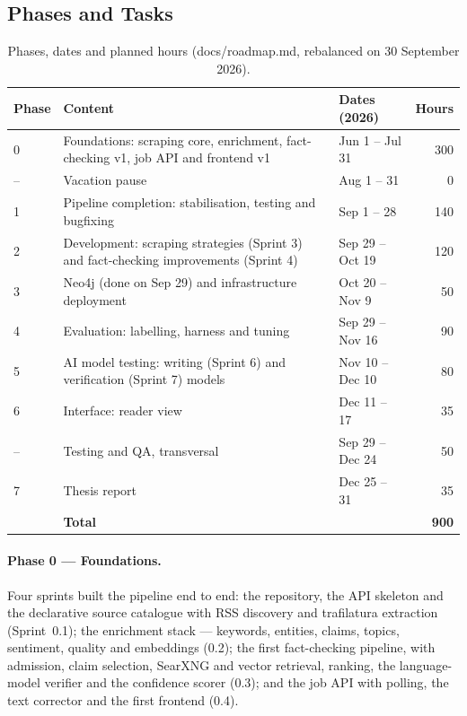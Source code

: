 
\subsection{Phases and Tasks}
\label{subsec:phases}

\begin{table}[H]
\centering
\small
\caption{Phases, dates and planned hours (docs/roadmap.md, rebalanced
on 30 September 2026).}
\label{tab:phases}
\begin{tabularx}{\linewidth}{@{}lXlr@{}}
\toprule
Phase & Content & Dates (2026) & Hours \\
\midrule
0 & Foundations: scraping core, enrichment, fact-checking v1, job
    API and frontend v1 & Jun 1 -- Jul 31 & 300 \\
-- & Vacation pause & Aug 1 -- 31 & 0 \\
1 & Pipeline completion: stabilisation, testing and bugfixing
    & Sep 1 -- 28 & 140 \\
2 & Development: scraping strategies (Sprint 3) and fact-checking
    improvements (Sprint 4) & Sep 29 -- Oct 19 & 120 \\
3 & Neo4j (done on Sep 29) and infrastructure deployment
    & Oct 20 -- Nov 9 & 50 \\
4 & Evaluation: labelling, harness and tuning & Sep 29 -- Nov 16 & 90 \\
5 & AI model testing: writing (Sprint 6) and verification
    (Sprint 7) models & Nov 10 -- Dec 10 & 80 \\
6 & Interface: reader view & Dec 11 -- 17 & 35 \\
-- & Testing and QA, transversal & Sep 29 -- Dec 24 & 50 \\
7 & Thesis report & Dec 25 -- 31 & 35 \\
\midrule
  & \textbf{Total} & & \textbf{900} \\
\bottomrule
\end{tabularx}
\end{table}

\paragraph{Phase 0 --- Foundations.} Four sprints built the pipeline
end to end: the repository, the API skeleton and the declarative source
catalogue with RSS discovery and trafilatura extraction (Sprint~0.1);
the enrichment stack --- keywords, entities, claims, topics, sentiment,
quality and embeddings (0.2); the first fact-checking pipeline, with
admission, claim selection, SearXNG and vector retrieval, ranking, the
language-model verifier and the confidence scorer (0.3); and the job
API with polling, the text corrector and the first frontend (0.4).

